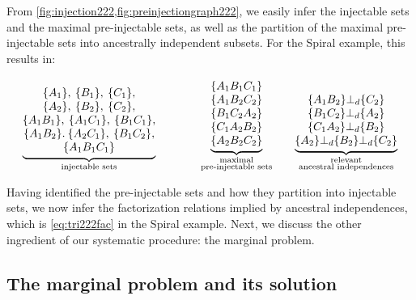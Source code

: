 \documentclass[aps,english,superscriptaddress,onecolumn,twoside,longbibliography,pra,floatfix,fleqn,nofootinbib]{revtex4-1}%
\theoremstyle{definition}
\newcounter{example}[section]
\newcommand{\aindep}{\ensuremath{\cramp{\perp_d}}} %
\newcommand{\cramp}[1]{\ensuremath{\mathord{#1}}}
\DeclarePairedDelimiter{\braces}{\lbrace}{\rbrace}
\newcommand{\brackets}[1]{\braces*{#1}}
\begin{document}
From \cref{fig:injection222,fig:preinjectiongraph222}, we easily infer the injectable sets and the maximal pre-injectable sets, as well as the partition of the maximal pre-injectable sets into ancestrally independent subsets. For the Spiral example, this results in:
\begin{align}\label{eq:basicsetup222}
{\underbrace{\begin{matrix}
\, \\
\brackets{A_1},\:\brackets{B_1},\:\brackets{C_1},\\
\brackets{A_2},\:\brackets{B_2},\:\brackets{C_2},\\
\brackets{A_1 B_1},\:\brackets{A_1 C_1},\:\brackets{B_1 C_1},\\
\brackets{A_1 B_2}.\:\brackets{A_2 C_1},\:\brackets{B_1 C_2},\\
\brackets{A_1 B_1 C_1}
\end{matrix}}_{\substack{\text{injectable sets}}}}
\qquad\qquad
{\underbrace{\begin{matrix}
\brackets{A_1 B_1 C_1} \\
\brackets{A_1 B_2 C_2} \\
\brackets{B_1 C_2 A_2} \\
\brackets{C_1 A_2 B_2} \\
\brackets{A_2 B_2 C_2}
\end{matrix}}_{\substack{\text{maximal}\\\text{pre-injectable sets}}}}
\qquad
{\underbrace{\begin{matrix}
\\
\{A_1 B_2\} \aindep \{ C_2\} \\
\{B_1 C_2\} \aindep \{ A_2\} \\
\{C_1 A_2\} \aindep \{ B_2\} \\
\{A_2\} \aindep \{B_2\} \aindep \{ C_2\}
\end{matrix}}_{\substack{\text{relevant}\\\text{ancestral independences}}}}
\end{align}

Having identified the pre-injectable sets and how they partition into injectable sets, we now infer the factorization relations implied by ancestral independences, which is \cref{eq:tri222fac} in the Spiral example. Next, we discuss the other ingredient of our systematic procedure: the marginal problem.

\subsection{The marginal problem and its solution}
\label{step:marginalsproblem}
\end{document}

